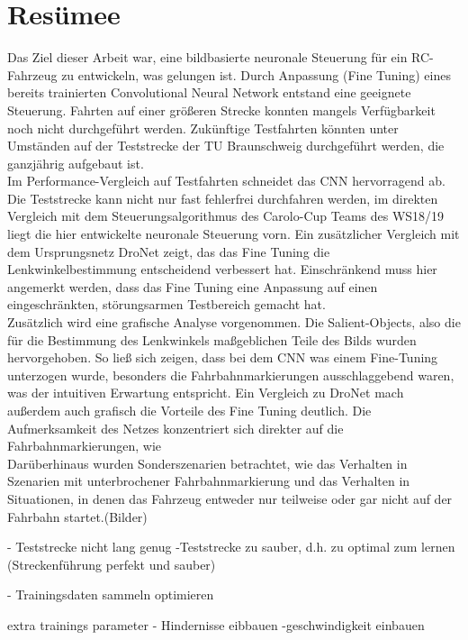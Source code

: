 %
\chapter{Resümee}

Das Ziel dieser Arbeit war, eine bildbasierte neuronale Steuerung für ein RC-Fahrzeug zu entwickeln, was gelungen ist. Durch Anpassung (Fine Tuning) eines bereits trainierten Convolutional Neural Network entstand eine geeignete Steuerung. Fahrten auf einer größeren Strecke konnten mangels Verfügbarkeit noch nicht durchgeführt werden. Zukünftige Testfahrten könnten unter Umständen auf der Teststrecke der TU Braunschweig durchgeführt werden, die ganzjährig aufgebaut ist.\\
Im Performance-Vergleich auf Testfahrten schneidet das CNN hervorragend ab. Die Teststrecke kann nicht nur fast fehlerfrei durchfahren werden, im direkten Vergleich mit dem Steuerungsalgorithmus des Carolo-Cup Teams des WS18/19 liegt die hier entwickelte neuronale Steuerung vorn. Ein zusätzlicher Vergleich mit dem Ursprungsnetz DroNet zeigt, das das Fine Tuning die Lenkwinkelbestimmung entscheidend verbessert hat. Einschränkend muss hier angemerkt werden, dass das Fine Tuning eine Anpassung auf einen eingeschränkten, störungsarmen Testbereich gemacht hat.\\
Zusätzlich wird eine grafische Analyse vorgenommen. Die Salient-Objects, also die für die Bestimmung des Lenkwinkels maßgeblichen Teile des Bilds wurden hervorgehoben. So ließ sich zeigen, dass bei dem CNN was einem Fine-Tuning unterzogen wurde, besonders die Fahrbahnmarkierungen ausschlaggebend waren, was der intuitiven Erwartung entspricht. Ein Vergleich zu DroNet mach außerdem auch grafisch die Vorteile des Fine Tuning deutlich. Die \glqq Aufmerksamkeit \grqq{} des Netzes konzentriert sich direkter auf die Fahrbahnmarkierungen, wie \\

Darüberhinaus wurden Sonderszenarien betrachtet, wie das Verhalten in Szenarien mit unterbrochener Fahrbahnmarkierung und das Verhalten in Situationen, in denen das Fahrzeug entweder nur teilweise oder gar nicht auf der Fahrbahn startet.(Bilder)






- Teststrecke nicht lang genug 
-Teststrecke zu sauber, d.h. zu optimal zum lernen (Streckenführung perfekt und sauber)

- Trainingsdaten sammeln optimieren

extra trainings parameter
- Hindernisse eibbauen
-geschwindigkeit einbauen
